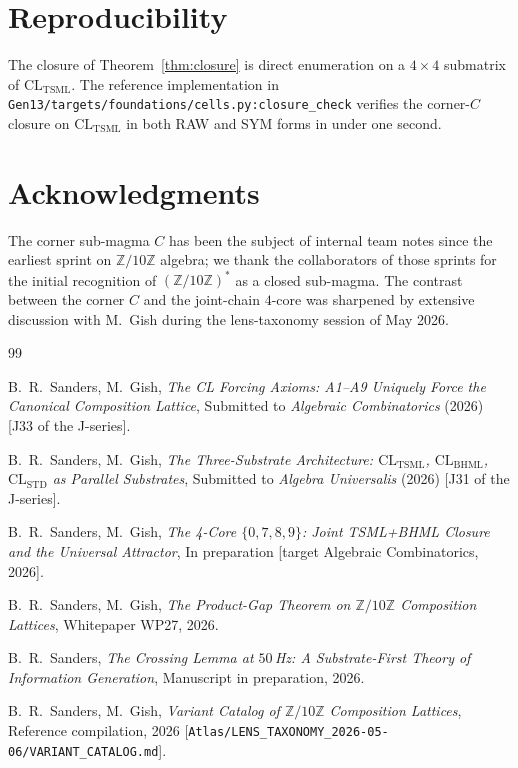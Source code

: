 \documentclass[11pt,reqno]{amsart}
\theoremstyle{plain}
\theoremstyle{definition}
\theoremstyle{remark}
\newcommand{\Z}{\mathbb{Z}}
\newcommand{\TSML}{\mathrm{TSML}}
\newcommand{\BHML}{\mathrm{BHML}}
\begin{document}
\section{Reproducibility}
\label{sec:repro}

The closure of Theorem~\ref{thm:closure} is direct enumeration on a
$4 \times 4$ submatrix of $\mathrm{CL}_\TSML$. The reference
implementation in
\texttt{Gen13/targets/foundations/cells.py:closure\_check}
verifies the corner-$C$ closure on $\mathrm{CL}_\TSML$ in both RAW and SYM
forms in under one second.

\section*{Acknowledgments}
The corner sub-magma $C$ has been the subject of internal team notes
since the earliest sprint on $\Z/10\Z$ algebra; we thank the
collaborators of those sprints for the initial recognition of
$(\Z/10\Z)^*$ as a closed sub-magma. The contrast between the corner
$C$ and the joint-chain $4$-core was sharpened by extensive discussion
with M.~Gish during the lens-taxonomy session of May 2026.

\begin{thebibliography}{99}

B.~R.~Sanders, M.~Gish,
\emph{The CL Forcing Axioms: A1--A9 Uniquely Force the Canonical Composition Lattice},
Submitted to \emph{Algebraic Combinatorics} (2026)
[J33 of the J-series].

B.~R.~Sanders, M.~Gish,
\emph{The Three-Substrate Architecture: $\mathrm{CL}_\TSML$, $\mathrm{CL}_\BHML$, $\mathrm{CL}_\mathrm{STD}$ as Parallel Substrates},
Submitted to \emph{Algebra Universalis} (2026)
[J31 of the J-series].

B.~R.~Sanders, M.~Gish,
\emph{The 4-Core $\{0,7,8,9\}$: Joint TSML+BHML Closure and the Universal Attractor},
In preparation [target Algebraic Combinatorics, 2026].

B.~R.~Sanders, M.~Gish,
\emph{The Product-Gap Theorem on $\Z/10\Z$ Composition Lattices},
Whitepaper WP27, 2026.

B.~R.~Sanders,
\emph{The Crossing Lemma at $50\,$Hz: A Substrate-First Theory of Information Generation},
Manuscript in preparation, 2026.

B.~R.~Sanders, M.~Gish,
\emph{Variant Catalog of $\Z/10\Z$ Composition Lattices},
Reference compilation, 2026
[\texttt{Atlas/LENS\_TAXONOMY\_2026-05-06/VARIANT\_CATALOG.md}].

\end{thebibliography}
\end{document}
